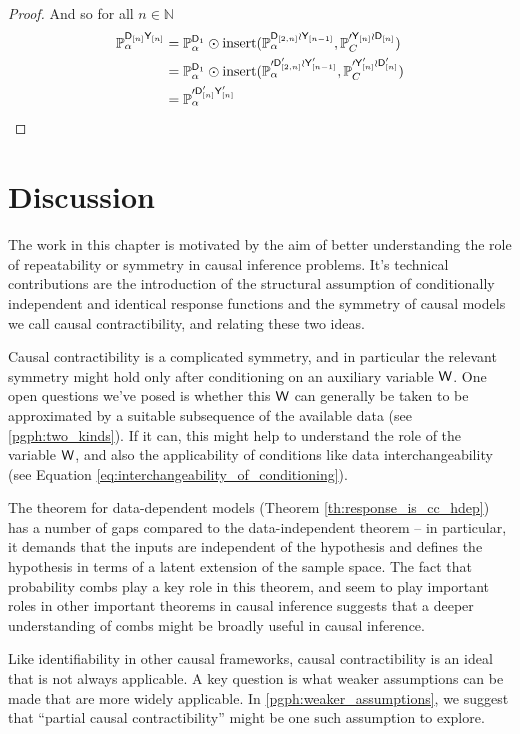 \begin{proof}
And so for all $n\in \mathbb{N}$
\begin{align}
    \mathbb{P}_\alpha^{\mathsf{D}_{[n]} \mathsf{Y}_{[n]}} &=  \mathbb{P}_\alpha^{\mathsf{D}_1}\odot \text{insert}(\mathbb{P}_\alpha^{ \mathsf{D}_{[2,n]}\wr\mathsf{Y}_{[n-1]}}, \mathbb{P}_C^{\prime \mathsf{Y}_{[n]}\wr\mathsf{D}_{[n]}}) \\
    &= \mathbb{P}_\alpha^{\mathsf{D}_1}\odot \text{insert}(\mathbb{P}_\alpha^{\prime \mathsf{D}'_{[2,n]}\wr\mathsf{Y}'_{[n-1]}}, \mathbb{P}_C^{\prime \mathsf{Y}'_{[n]}\wr\mathsf{D}'_{[n]}}) \\
    &= \mathbb{P}_\alpha^{\prime\mathsf{D}'_{[n]} \mathsf{Y}'_{[n]}}
\end{align}
\end{proof}

\section{Discussion}\label{sec:discussion}

The work in this chapter is motivated by the aim of better understanding the role of repeatability or symmetry in causal inference problems. It's technical contributions are the introduction of the structural assumption of conditionally independent and identical response functions and the symmetry of causal models we call causal contractibility, and relating these two ideas. 

Causal contractibility is a complicated symmetry, and in particular the relevant symmetry might hold only after conditioning on an auxiliary variable $\mathsf{W}$. One open questions we've posed is whether this $\mathsf{W}$ can generally be taken to be approximated by a suitable subsequence of the available data (see \ref{pgph:two_kinds}). If it can, this might help to understand the role of the variable $\mathsf{W}$, and also the applicability of conditions like data interchangeability (see Equation \ref{eq:interchangeability_of_conditioning}).

The theorem for data-dependent models (Theorem \ref{th:response_is_cc_hdep}) has a number of gaps compared to the data-independent theorem -- in particular, it demands that the inputs are independent of the hypothesis and defines the hypothesis in terms of a latent extension of the sample space. The fact that probability combs play a key role in this theorem, and seem to play important roles in other important theorems in causal inference suggests that a deeper understanding of combs might be broadly useful in causal inference.

Like identifiability in other causal frameworks, causal contractibility is an ideal that is not always applicable. A key question is what weaker assumptions can be made that are more widely applicable. In \ref{pgph:weaker_assumptions}, we suggest that ``partial causal contractibility'' might be one such assumption to explore.

